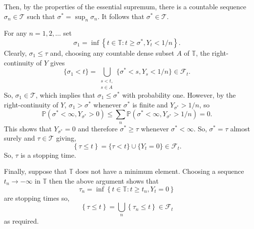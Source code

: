 \documentclass[12pt]{article}
\begin{document}
Then, by the properties of the essential supremum, there is a countable sequence $\sigma_n\in\mathcal{T}$ such that $\sigma^*=\sup_n\sigma_n$. It follows that $\sigma^*\in\mathcal{T}$.

For any $n=1,2,\ldots$ set
\begin{equation*}
\sigma_1=\inf\left\{t\in\mathbb{T}:t\ge\sigma^*,Y_t< 1/n\right\}.
\end{equation*}
Clearly, $\sigma_1\le\tau$ and, choosing any countable dense subset $A$ of $\mathbb{T}$, the right-continuity of $Y$ gives
\begin{equation*}
\{\sigma_1<t\}=\bigcup_{\substack{s<t,\\ s\in A}}\{\sigma^*< s,Y_s<1/n\}\in\mathcal{F}_t.
\end{equation*}
So, $\sigma_1\in\mathcal{T}$, which implies that $\sigma_1\le\sigma^*$ with probability one.
However, by the right-continuity of $Y$, $\sigma_1>\sigma^*$ whenever $\sigma^*$ is finite and $Y_{\sigma^*}>1/n$, so
\begin{equation*}
\mathbb{P}(\sigma^*<\infty,Y_{\sigma^*}>0)\le\sum_n\mathbb{P}(\sigma^*<\infty,Y_{\sigma^*}>1/n)=0.
\end{equation*}
This shows that $Y_{\sigma^*}=0$ and therefore $\sigma^*\ge\tau$ whenever $\sigma^*<\infty$. So, $\sigma^*=\tau$ almost surely and $\tau\in\mathcal{T}$ giving,
\begin{equation*}
\left\{\tau\le t\right\}=\{\tau<t\}\cup\{Y_t=0\}\in\mathcal{F}_t.
\end{equation*}
So, $\tau$ is a stopping time.

Finally, suppose that $\mathbb{T}$ does not have a minimum element. Choosing a sequence $t_n\rightarrow-\infty$ in $\mathbb{T}$ then the above argument shows that
\begin{equation*}
\tau_n=\inf\left\{t\in\mathbb{T}:t\ge t_n, Y_t=0\right\}
\end{equation*}
are stopping times so,
\begin{equation*}
\left\{\tau\le t\right\}=\bigcup_n\left\{\tau_n\le t\right\}\in\mathcal{F}_t
\end{equation*}
as required.

\end{document}
